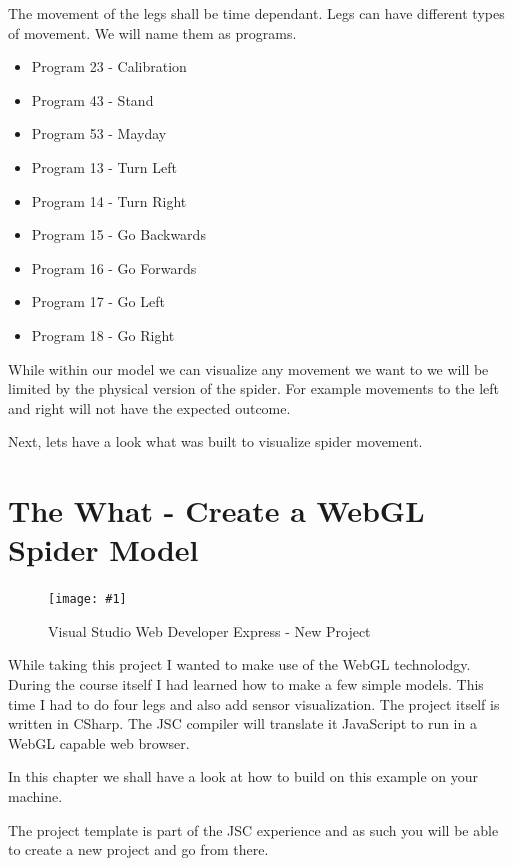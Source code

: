 \documentclass[12pt,leqno]{book}
\newcommand{\png}[1]{\texttt{[image: \#1]}}
\newcommand{\figpng}[2]{\begin{figure}[htb]\centering\png{#1}\caption{#2}\end{figure}}
\begin{document}
The movement of the legs shall be time dependant. Legs can have different types of movement. We will name them as programs.



\begin{itemize}
\item Program 23 - Calibration
\item Program 43 - Stand
\item Program 53 - Mayday
\item Program 13 - Turn Left
\item Program 14 - Turn Right
\item Program 15 - Go Backwards
\item Program 16 - Go Forwards
\item Program 17 - Go Left
\item Program 18 - Go Right
\end{itemize}

While within our model we can visualize any movement we want to we will be limited by the physical version of the spider.
For example movements to the left and right will not have the expected outcome. 

Next, lets have a look what was built to visualize spider movement.








\chapter{The What - Create a WebGL Spider Model}
\figpng{Images/New_Project-2012-03-13_09.19.10}
{Visual Studio Web Developer Express - New Project}


While taking this project I wanted to make use of the WebGL technolodgy. During the course itself I had learned how to make a few simple models. This time I had to do four legs and also add sensor visualization. The project itself is written in CSharp. The JSC compiler will translate it JavaScript to run in a WebGL capable web browser.


In this chapter we shall have a look at how to build on this example on your machine.

The project template is part of the JSC experience and as such you will be able to create a new project and go from there.
\end{document}
